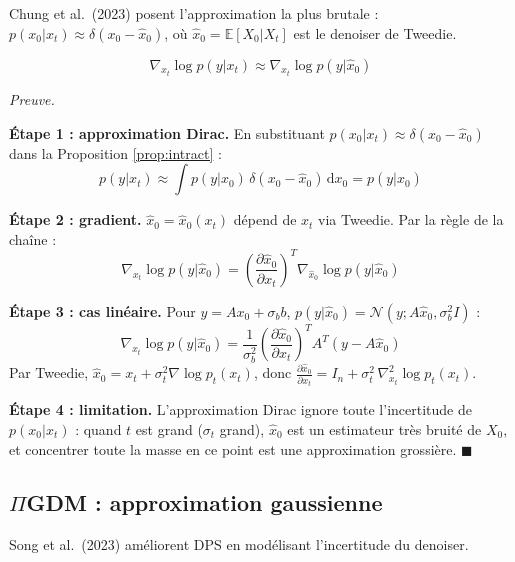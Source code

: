 \documentclass[12pt]{article}
\renewcommand{\qedsymbol}{$\blacksquare$}
\renewenvironment{proof}[1][\proofname]{%
  \par\medskip\noindent
  \textit{\color{proofgray}#1.}\enspace\ignorespaces
}{\hfill\qedsymbol\par\medskip}
\renewcommand{\proofname}{Preuve}
\begin{document}
Chung et al.\ (2023) posent l'approximation la plus brutale : $p(x_0 | x_t) \approx \delta(x_0 - \hat{x}_0)$, où $\hat{x}_0 = \mathbb{E}[X_0 | X_t]$ est le denoiser de Tweedie.

\begin{resultbox}
\label{res:dps}
\begin{equation}
    \nabla_{x_t} \log p(y | x_t) \approx \nabla_{x_t} \log p(y | \hat{x}_0)
\end{equation}
\end{resultbox}

  \begin{proof}







\textbf{Étape 1 : approximation Dirac.} En substituant $p(x_0 | x_t) \approx \delta(x_0 - \hat{x}_0)$ dans la Proposition \ref{prop:intract} :
\[
p(y | x_t) \approx \int p(y | x_0)\, \delta(x_0 - \hat{x}_0)\, \mathrm{d}x_0 = p(y | \hat{x}_0)
\]

\textbf{Étape 2 : gradient.} $\hat{x}_0 = \hat{x}_0(x_t)$ dépend de $x_t$ via Tweedie. Par la règle de la chaîne :
\[
\nabla_{x_t} \log p(y | \hat{x}_0) = \left(\frac{\partial \hat{x}_0}{\partial x_t}\right)^{\!T} \nabla_{\hat{x}_0} \log p(y | \hat{x}_0)
\]

\textbf{Étape 3 : cas linéaire.} Pour $y = Ax_0 + \sigma_b b$, $p(y | \hat{x}_0) = \mathcal{N}(y; A\hat{x}_0, \sigma_b^2 I)$ :
\[
\nabla_{x_t} \log p(y | \hat{x}_0) = \frac{1}{\sigma_b^2}\left(\frac{\partial \hat{x}_0}{\partial x_t}\right)^{\!T} A^T(y - A\hat{x}_0)
\]
Par Tweedie, $\hat{x}_0 = x_t + \sigma_t^2 \nabla \log p_t(x_t)$, donc $\frac{\partial \hat{x}_0}{\partial x_t} = I_n + \sigma_t^2\, \nabla_{x_t}^2 \log p_t(x_t)$.

\textbf{Étape 4 : limitation.} L'approximation Dirac ignore toute l'incertitude de $p(x_0 | x_t)$ : quand $t$ est grand ($\sigma_t$ grand), $\hat{x}_0$ est un estimateur très bruité de $X_0$, et concentrer toute la masse en ce point est une approximation grossière.
\end{proof}


\subsection{$\Pi$GDM : approximation gaussienne}

Song et al.\ (2023) améliorent DPS en modélisant l'incertitude du denoiser.
\end{document}
